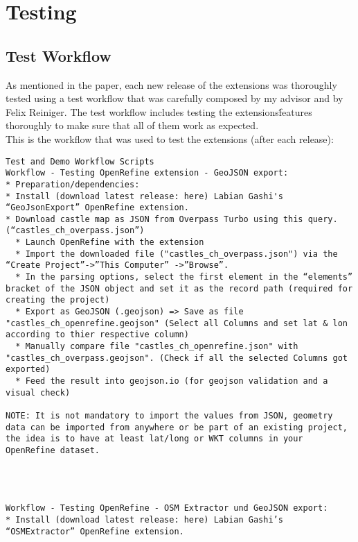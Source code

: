 \chapter{Testing}
\section{Test Workflow}\label{sec:test-workflow}
As mentioned in the paper, each new release of the extensions was thoroughly tested using a test workflow that was
carefully composed by my advisor and by Felix Reiniger. The test workflow includes testing the extensions\' features
thoroughly to make sure that all of them work as expected.\\
\newline
This is the workflow that was used to test the extensions (after each release):
\begin{verbatim}
Test and Demo Workflow Scripts
Workflow - Testing OpenRefine extension - GeoJSON export:
* Preparation/dependencies:
* Install (download latest release: here) Labian Gashi's “GeoJsonExport” OpenRefine extension.
* Download castle map as JSON from Overpass Turbo using this query. (“castles_ch_overpass.json”)
  * Launch OpenRefine with the extension
  * Import the downloaded file ("castles_ch_overpass.json") via the “Create Project”->”This Computer” ->”Browse”.
  * In the parsing options, select the first element in the “elements” bracket of the JSON object and set it as the record path (required for creating the project)
  * Export as GeoJSON (.geojson) => Save as file "castles_ch_openrefine.geojson" (Select all Columns and set lat & lon according to thier respective column)
  * Manually compare file "castles_ch_openrefine.json" with "castles_ch_overpass.geojson". (Check if all the selected Columns got exported)
  * Feed the result into geojson.io (for geojson validation and a visual check)

NOTE: It is not mandatory to import the values from JSON, geometry data can be imported from anywhere or be part of an existing project, the idea is to have at least lat/long or WKT columns in your OpenRefine dataset.




Workflow - Testing OpenRefine - OSM Extractor und GeoJSON export:
* Install (download latest release: here) Labian Gashi’s “OSMExtractor” OpenRefine extension.


\end{verbatim}
